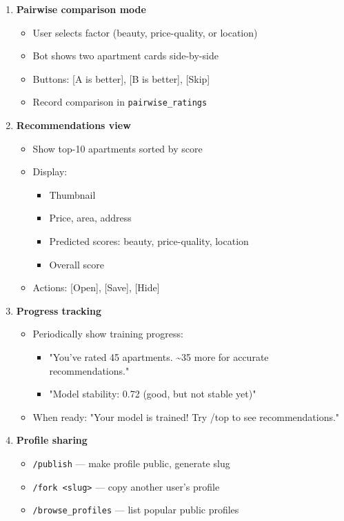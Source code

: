 \documentclass[12pt,a4paper]{article}
\begin{document}
\begin{enumerate}
    \item \textbf{Pairwise comparison mode}
    \begin{itemize}
        \item User selects factor (beauty, price-quality, or location)
        \item Bot shows two apartment cards side-by-side
        \item Buttons: [A is better], [B is better], [Skip]
        \item Record comparison in \texttt{pairwise\_ratings}
    \end{itemize}
    
    \item \textbf{Recommendations view}
    \begin{itemize}
        \item Show top-10 apartments sorted by score
        \item Display:
        \begin{itemize}
            \item Thumbnail
            \item Price, area, address
            \item Predicted scores: beauty, price-quality, location
            \item Overall score
        \end{itemize}
        \item Actions: [Open], [Save], [Hide]
    \end{itemize}
    
    \item \textbf{Progress tracking}
    \begin{itemize}
        \item Periodically show training progress:
        \begin{itemize}
            \item "You've rated 45 apartments. \textasciitilde35 more for accurate recommendations."
            \item "Model stability: 0.72 (good, but not stable yet)"
        \end{itemize}
        \item When ready: "Your model is trained! Try /top to see recommendations."
    \end{itemize}
    
    \item \textbf{Profile sharing}
    \begin{itemize}
        \item \texttt{/publish} — make profile public, generate slug
        \item \texttt{/fork <slug>} — copy another user's profile
        \item \texttt{/browse\_profiles} — list popular public profiles
    \end{itemize}
    

\end{enumerate}
\end{document}
